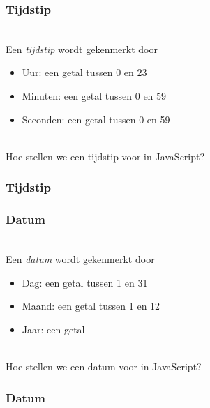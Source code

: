 \begin{frame}
  \frametitle{Tijdstip}
   \\
  Een \emph{tijdstip} wordt gekenmerkt door
  \begin{itemize}
    \item Uur: een getal tussen 0 en 23
    \item Minuten: een getal tussen 0 en 59
    \item Seconden: een getal tussen 0 en 59
  \end{itemize}
  \vskip4mm
   \\
  Hoe stellen we een tijdstip voor in JavaScript?
\end{frame}

\begin{frame}
  \frametitle{Tijdstip}
  \begin{center}
  \end{center}
  \vskip5mm
\end{frame}


\begin{frame}
  \frametitle{Datum}
   \\
  Een \emph{datum} wordt gekenmerkt door
  \begin{itemize}
    \item Dag: een getal tussen 1 en 31
    \item Maand: een getal tussen 1 en 12
    \item Jaar: een getal
  \end{itemize}
  \vskip4mm
   \\
  Hoe stellen we een datum voor in JavaScript?
\end{frame}

\begin{frame}
  \frametitle{Datum}
  \begin{center}
  \end{center}
  \vskip5mm
\end{frame}


